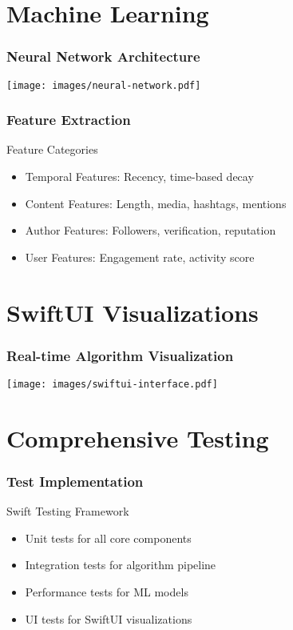 \documentclass[aspectratio=169]{beamer}
\begin{document}
\section{Machine Learning}

\begin{frame}
    \frametitle{Neural Network Architecture}
    \begin{center}
        \texttt{[image: images/neural-network.pdf]}
    \end{center}
\end{frame}

\begin{frame}
    \frametitle{Feature Extraction}
    \begin{block}{Feature Categories}
        \begin{itemize}
            \item Temporal Features: Recency, time-based decay
            \item Content Features: Length, media, hashtags, mentions
            \item Author Features: Followers, verification, reputation
            \item User Features: Engagement rate, activity score
        \end{itemize}
    \end{block}
\end{frame}

\section{SwiftUI Visualizations}

\begin{frame}
    \frametitle{Real-time Algorithm Visualization}
    \begin{center}
        \texttt{[image: images/swiftui-interface.pdf]}
    \end{center}
\end{frame}

\section{Comprehensive Testing}

\begin{frame}
    \frametitle{Test Implementation}
    \begin{block}{Swift Testing Framework}
        \begin{itemize}
            \item Unit tests for all core components
            \item Integration tests for algorithm pipeline
            \item Performance tests for ML models
            \item UI tests for SwiftUI visualizations
        \end{itemize}
    \end{block}
\end{frame}
\end{document}
